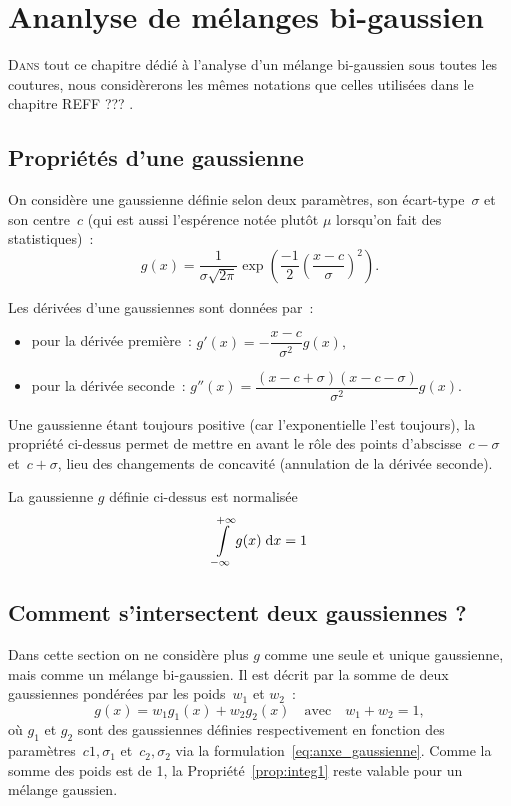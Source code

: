\documentclass[main.tex]{subfiles}
\begin{document}
\chapter{Ananlyse de mélanges bi-gaussien}
\lettrine[lines=2, lhang=0.33, loversize=0.25]{D}{ans} tout ce chapitre dédié à l'analyse d'un mélange bi-gaussien sous toutes les coutures, nous considèrerons les mêmes notations que celles utilisées dans le chapitre REFF ??? .

\section{Propriétés d'une gaussienne}
On considère une gaussienne définie selon deux paramètres, son écart-type~$\sigma$ et son centre~$c$ (qui est aussi l'espérence notée plutôt $\mu$ lorsqu'on fait des statistiques)~:
\begin{equation}
\label{eq:anxe_gaussienne}
g(x)=\dfrac{1}{\sigma \sqrt{2\pi}} \exp\left( \frac{-1}{2}  \left(  \dfrac{x-c}{\sigma} \right)^2  \right).
\end{equation}

\begin{prop}
Les dérivées d'une gaussiennes sont données par~:
\begin{itemize}
\item pour la dérivée première~: $g'(x)= -\dfrac{x-c}{\sigma^2}g(x), $
\item pour la dérivée seconde~: $g''(x)= \dfrac{(x-c+\sigma)(x-c-\sigma)}{\sigma^2}g(x). $
\end{itemize}
\end{prop}

Une gaussienne étant toujours positive (car l'exponentielle l'est toujours), la propriété ci-dessus permet de mettre en avant le rôle des points d'abscisse~$c-\sigma$ et~$c+\sigma$, lieu des changements de concavité (annulation de la dérivée seconde).

\begin{prop}
\label{prop:integ1}
La gaussienne $g$ définie ci-dessus est normalisée \ie
\begin{equation}
\label{eq:anxe_integ_gauss}
\int\limits_{-\infty}^{+\infty} g(x) \;{\rm d}x = 1
\end{equation}
\end{prop}


\section{Comment s'intersectent deux gaussiennes ?}
Dans cette section on ne considère plus $g$ comme une seule et unique gaussienne, mais comme un mélange bi-gaussien. Il est décrit par la somme de deux gaussiennes pondérées par les poids~$w_1$ et $w_2$~:
\begin{equation}
\label{eq:anxe_bi_gauss}
g(x)= w_1 g_1(x)+ w_2 g_2(x) \quad \textrm{avec} \quad w_1 + w_2=1,
\end{equation}
où $g_1$ et $g_2$ sont des gaussiennes définies respectivement en fonction des paramètres~$c1,\sigma_1$ et~$c_2,\sigma_2$ via la formulation~\eqref{eq:anxe_gaussienne}. Comme la somme des poids est de 1, la Propriété~\ref{prop:integ1} reste valable pour un mélange gaussien.
\end{document}
